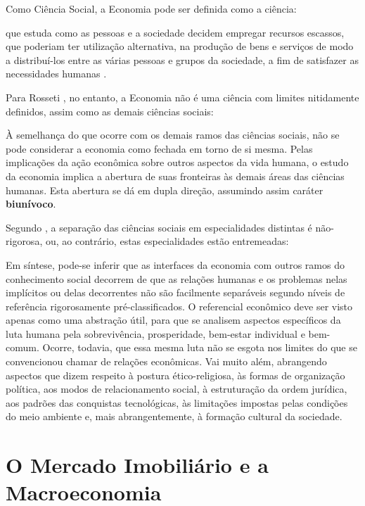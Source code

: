 \documentclass[
	12pt,				%
	oneside,			%
	a4paper,			%
	chapter=TITLE,		%
	section=TITLE,		%
	english,			%
	brazil				%
	]{abntex2}
\begin{document}
Como Ciência Social, a Economia pode ser definida como a ciência:
\begin{citacao}
que estuda como as pessoas e a sociedade decidem empregar recursos escassos, que
poderiam ter utilização alternativa, na produção de bens e serviços de modo a
distribuí-los  entre as várias pessoas e grupos da sociedade, a fim de
satisfazer as necessidades humanas
\cite[p.~5]{passosnogami}.
\end{citacao}
Para Rosseti \autocite*[31]{rossetti}, no entanto, a Economia não é uma
ciência com limites nitidamente definidos, assim como as demais ciências
sociais:
\begin{citacao}
À semelhança do que ocorre com os demais ramos das ciências sociais, não se pode
considerar a economia como fechada em torno de si mesma. Pelas implicações da
ação econômica sobre outros aspectos da vida humana, o estudo da economia
implica a abertura de suas fronteiras às demais áreas das ciências humanas. Esta
abertura se dá em dupla direção, assumindo assim caráter \textbf{biunívoco}.
\end{citacao}
Segundo \textcites{rosseti}[32]{rossetti}, a separação das ciências
sociais em especialidades distintas é não-rigorosa, ou, ao contrário,
estas especialidades estão entremeadas:
\begin{citacao}
Em síntese, pode-se inferir que as interfaces da economia com outros ramos do
conhecimento social decorrem de que as relações humanas e os problemas nelas
implícitos ou delas decorrentes não são facilmente separáveis segundo níveis de
referência rigorosamente pré-classificados. O referencial econômico deve ser
visto apenas como uma abstração útil, para que se analisem aspectos específicos
da luta humana pela sobrevivência, prosperidade, bem-estar individual e
bem-comum. Ocorre, todavia, que essa mesma luta não se esgota nos limites do que
se convencionou chamar de relações econômicas. Vai muito além, abrangendo
aspectos que dizem respeito à postura ético-religiosa, às formas de organização
política, aos modos de relacionamento social, à estruturação da ordem jurídica,
aos padrões das conquistas tecnológicas, às limitações impostas pelas condições
do meio ambiente e, mais abrangentemente, à formação cultural da sociedade.
\end{citacao}
\section{O Mercado Imobiliário e a Macroeconomia}\label{macro}
\end{document}
